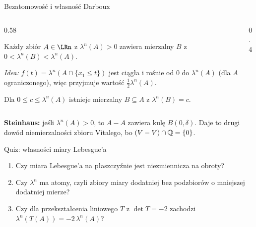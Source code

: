 \documentclass[aspectratio=169,11pt,t,envcountsect,professionalfonts]{beamer}
\begin{document}
\begin{frame}{Bezatomowość i własność Darboux}
  \begin{columns}[T]
    \begin{column}{0.58\textwidth}
      \begin{mythm}[Bezatomowość]
        Każdy zbiór $A \in \LRn$ z $\lambda^n(A) > 0$ zawiera mierzalny $B$ z $0 < \lambda^n(B) < \lambda^n(A)$.
      \end{mythm}
      \textit{Idea:} $f(t) = \lambda^n(A \cap \{x_1 \le t\})$ jest ciągła i rośnie od $0$ do $\lambda^n(A)$ (dla $A$ ograniczonego), więc przyjmuje wartość $\frac12 \lambda^n(A)$.

      \begin{mywn}
        Dla $0 \le c \le \lambda^n(A)$ istnieje mierzalny $B \subseteq A$ z $\lambda^n(B) = c$.
      \end{mywn}
    \end{column}
    \begin{column}{0.4\textwidth}
      \begin{center}
      \end{center}
    \end{column}
  \end{columns}

  \smallskip
  \textbf{Steinhaus:} jeśli $\lambda^n(A) > 0$, to $A - A$ zawiera kulę $B(0,\delta)$. Daje to drugi dowód niemierzalności zbioru Vitalego, bo $(V - V) \cap \mathbb{Q} = \{0\}$.
\end{frame}

\begin{frame}{Quiz: własności miary Lebesgue'a}
  \begin{enumerate}
    \item Czy miara Lebesgue'a na płaszczyźnie jest niezmiennicza na obroty?
    \item Czy $\lambda^n$ ma atomy, czyli zbiory miary dodatniej bez podzbiorów o mniejszej dodatniej mierze?
    \item Czy dla przekształcenia liniowego $T$ z $\det T = -2$ zachodzi $\lambda^n(T(A)) = -2\,\lambda^n(A)$?
  \end{enumerate}
\end{frame}
\end{document}
